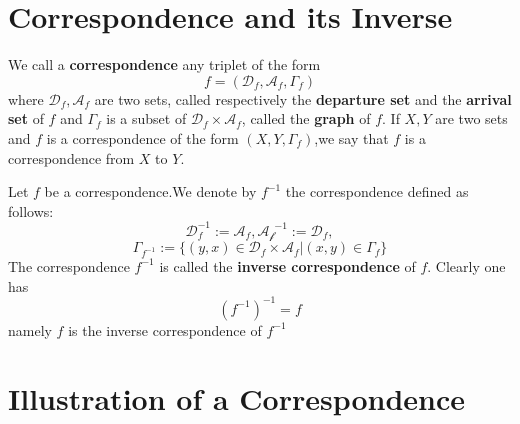 \documentclass{book}
\numberwithin{equation}{section}
\begin{document}
\section{Correspondence and its Inverse}
\begin{definitionenv}
    We call a \textbf{correspondence} any triplet of the form $$f=(\mathscr{D} _f,\mathscr{A}_f,\Gamma_f)$$
    where $\mathscr{D}_f,\mathscr{A}_f$ are two sets, called respectively the \textbf{departure set }  and the \textbf{arrival set} of $f$ and $\Gamma_f$ is a subset of $\mathscr{D}_f\times \mathscr{A}_f$, called the \textbf{graph} of $f$.
    \newline
    If $X,Y$ are two sets and $f$ is a correspondence of the form $(X,Y,\Gamma_f)$,we say that $f$ is a correspondence from $X$ to $Y$. 
\end{definitionenv}
\begin{definitionenv}
    Let $f$ be a correspondence.We denote by $f^{-1}$ the correspondence defined as follows:
    $$\mathscr{D}_f^{-1}:=\mathscr{A}_f,\mathscr{A_f}^{-1}:=\mathscr{D}_f,$$
    $$\Gamma_{f^{-1}}:=\{(y,x)\in \mathscr{D}_f\times \mathscr{A}_f|(x,y)\in \Gamma_f\}$$
    The correspondence $f^{-1}$ is called the \textbf{inverse correspondence} of $f$. Clearly one has $$(f^{-1})^{-1}=f$$
    namely $f$ is the inverse correspondence of $f^{-1}$
\end{definitionenv}
\section{Illustration of a Correspondence}
\end{document}
